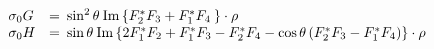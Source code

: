 \documentclass[a4paper,10pt]{article}
\def\cc{^*}
\def\Re{\mathrm{Re}}
\def\Im{\mathrm{Im}}
\begin{document}
\begin{displaymath}
\begin{array}{lcl}
\sigma_0 G     &\hspace{-0.67em}=&\hspace{-0.5em} \sin^2\theta \:\Im\left\lbrace F_2\cc F_3 + F_1\cc F_4\:
                                                \right\rbrace \cdot \rho\\
\sigma_0 H_{\phantom{z^\prime}} &\hspace{-0.67em}=&\hspace{-0.5em} \sin\theta \:\Im \left\lbrace 2 F_1\cc F_2 + F_1\cc F_3 
                                               - F_2\cc F_4 -\cos\theta\left( F_2\cc F_3 - F_1\cc F_4 \right)
                                                 \right\rbrace \cdot \rho\\
&\hspace{-0.67em}&\hspace{-0.5em}\phantom{\Re\left\lbrace 2F_1\cc F_2 - \cos\theta\left(|F_1|^2  + |F_2|^2\right)
           + \sin^2\theta\left(F_1\cc F_3 + F_2\cc F_4 + F_3\cc F_4\right)
           + \frac{1}{2}\cos\theta\sin^2\theta\left(|F_3|^2 + |F_4|^2\right) \right\rbrace \cdot \rho}\vspace{-1.5em}\\
\end{array}
\end{displaymath}
\end{document}
